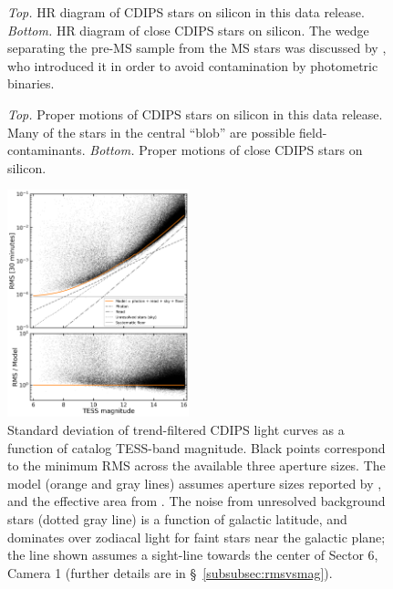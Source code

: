 \documentclass[12pt,twocolumn,tighten]{aastex62}
\begin{document}
\begin{figure}[!ht]
	\vspace{-0.8cm}
	\vspace{-0.8cm}
	\caption{
		{\it Top.} HR diagram of CDIPS stars on silicon in this
		data release.  {\it Bottom.} HR diagram of close CDIPS stars on
		silicon. The wedge separating the pre-MS sample from the MS
		stars was discussed by \citet{zari_3d_2018}, who introduced it in
		order to avoid contamination by photometric binaries.
	}
	\label{fig:hrd}
\end{figure}

\begin{figure}[!t]
	\vspace{-0.8cm}
	\vspace{-0.8cm}
	\caption{
		{\it Top.} Proper motions of CDIPS stars on silicon in this
		data release.  Many of the stars in the central ``blob'' are possible
		field-contaminants.
		{\it Bottom.} Proper motions of close CDIPS stars
		on silicon.
	}
	\label{fig:propermotions}
\end{figure}

\begin{figure}[!t]
	\begin{center}
		\leavevmode
		\includegraphics[width=0.47\textwidth]{rms_vs_mag.png}
	\end{center}
	\vspace{-0.5cm}
	\caption{
    Standard deviation of trend-filtered CDIPS light curves as a
    function of catalog TESS-band magnitude.  Black points correspond
    to the minimum RMS across the available three aperture sizes.  The
    model (orange and gray lines) assumes aperture sizes reported by
    \citet{Sullivan_et_al_2015}, and the effective area from
    \citet{vanderspek_2018}.  The noise from unresolved background
    stars (dotted gray line) is a function of galactic latitude, and
    dominates over zodiacal light for faint stars near the galactic
    plane; the line shown assumes a sight-line towards the center of
    Sector 6, Camera 1 (further details are in
    \S~\ref{subsubsec:rmsvsmag}).
		\label{fig:rms_vs_mag}
	}
\end{figure}
\end{document}
